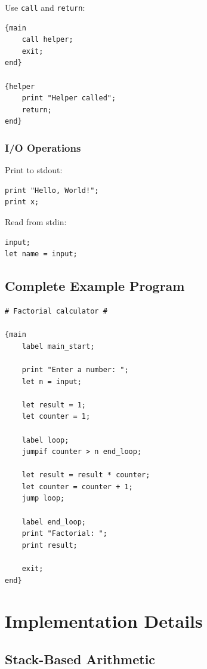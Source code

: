 \documentclass[11pt,a4paper]{article}
\begin{document}
Use \texttt{call} and \texttt{return}:

\begin{lstlisting}[style=arcturuscode]
{main
    call helper;
    exit;
end}

{helper
    print "Helper called";
    return;
end}
\end{lstlisting}

\subsubsection{I/O Operations}

Print to stdout:
\begin{lstlisting}[style=arcturuscode]
print "Hello, World!";
print x;
\end{lstlisting}

Read from stdin:
\begin{lstlisting}[style=arcturuscode]
input;
let name = input;
\end{lstlisting}

\subsection{Complete Example Program}

\begin{lstlisting}[style=arcturuscode]
# Factorial calculator #

{main
    label main_start;
    
    print "Enter a number: ";
    let n = input;
    
    let result = 1;
    let counter = 1;
    
    label loop;
    jumpif counter > n end_loop;
    
    let result = result * counter;
    let counter = counter + 1;
    jump loop;
    
    label end_loop;
    print "Factorial: ";
    print result;
    
    exit;
end}
\end{lstlisting}

\newpage
\section{Implementation Details}

\subsection{Stack-Based Arithmetic}
\end{document}
